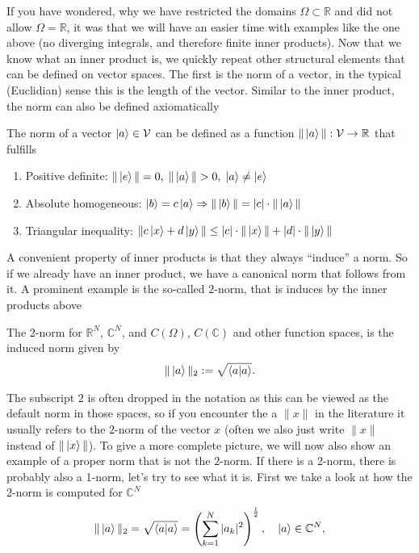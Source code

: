 If you have wondered, why we have restricted the domains  $\Omega\subset \mathbb{R}$ and did not allow $\Omega=\mathbb{R}$, it was that we will have an easier time with examples like the one above (no diverging integrals, and therefore finite inner products).
Now that we know what an inner product is, we quickly repeat other structural elements that can be defined on vector spaces. 
The first is the norm of a vector, in the typical (Euclidian) sense this is the length of the vector.
Similar to the inner product, the norm can also be defined axiomatically
\begin{def*}[norm] The norm of a vector $\ket{a}\in\mathcal{V}$ can be defined as a function $\| \ket{a} \| : \mathcal{V} \rightarrow \mathbb{R}$ that fulfills
\begin{enumerate}
    \item Positive definite: $\|\ket{e}\| = 0,\; \|\ket{a}\|>0,\; \ket{a}\neq \ket{e}$
    \item Absolute homogeneous: $\ket{b} = c\ket{a}\Rightarrow \|\ket{b}\| = |c|\cdot\|\ket{a}\|$
    \item Triangular inequality: $\| c\ket{x}+ d\ket{y}\| \leq |c|\cdot\|\ket{x} \| + |d|\cdot\| \ket{y} \| $
\end{enumerate}
\end{def*}
A convenient property of inner products is that they always ``induce'' a norm. So if we already have an inner product, we have a canonical norm that follows from it.
A prominent example is the so-called $2$-norm, that is induces by the inner products above
\begin{def*}[2-norm] The 2-norm for $\mathbb{R}^N$, $\mathbb{C}^N$, and $C(\Omega)$, $C(\mathbb{C})$ and other function spaces, is the induced norm given by
\begin{align*}
    \|\ket{a}\|_2 := \sqrt{\braket{a}{a}}.
\end{align*}
\end{def*}
The subscript $2$ is often dropped in the notation as this can be viewed as the default norm in those spaces, so if you encounter the a $\| x\| $ in the literature it usually refers to the $2$-norm of the vector $x$ (often we also just write $\|x \|$ instead of $\|\ket{x} \|$). 
To give a more complete picture, we will now also show an example of 
a proper norm that is not the 2-norm. If there is a 2-norm, there is probably also a 1-norm, let's try to see what it is. First we take a look at how the 2-norm is computed for $\mathbb{C}^N$
\begin{align}
    \| \ket{a} \|_2 = \sqrt{\braket{a}{a}} = \left(\sum_{k=1}^N |a_k|^2\right)^{\frac{1}{2}}, \quad \ket{a}\in\mathbb{C}^N,
\end{align}
